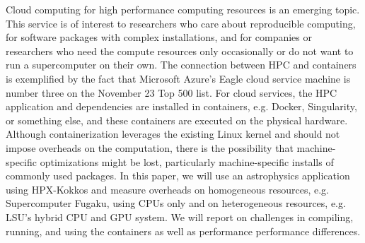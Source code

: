 Cloud computing for high performance computing resources is an emerging topic. This service is of interest to researchers who care about reproducible computing, for software packages with complex installations, and for companies or researchers who need the compute resources only occasionally or do not want to run a supercomputer on their own. The connection between HPC and containers is exemplified by the fact that Microsoft Azure's Eagle cloud service machine is number three on the November 23 Top 500 list. For cloud services, the HPC application and dependencies are installed in containers, e.g. Docker, Singularity, or something else, and these containers are executed on the physical hardware. Although containerization leverages the existing Linux kernel and should not impose overheads on the computation, there is the possibility that machine-specific optimizations might be lost, particularly machine-specific installs of commonly used packages. In this paper, we will use an astrophysics application using HPX-Kokkos and measure overheads on homogeneous resources, e.g. Supercomputer Fugaku, using CPUs only and on heterogeneous resources, e.g. LSU's hybrid CPU and GPU system. We will report on challenges in compiling, running, and using the containers as well as performance performance differences.
